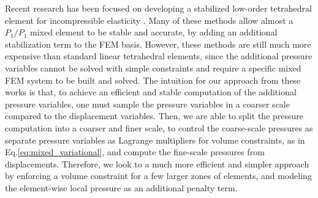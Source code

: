 Recent research has been focused on developing a stabilized low-order tetrahedral element for
incompressible elasticity \cite{scovazzi:2016}. Many of these methods allow almost a $P_1 / P_1$
mixed element to be stable and accurate, by adding an additional stabilization term to the FEM basis. However, these methods are still much more expensive than standard linear tetrahedral elements, since the additional pressure variables cannot be solved with simple constraints and require a specific mixed FEM system to be built and solved.
The intuition for our approach from these works is that, to achieve an efficient and stable computation of the additional pressure variables, one must sample the pressure variables in a coarser scale compared to the displacement variables. Then, we are able to split the pressure computation into a coarser and finer scale, to control the coarse-scale pressures as separate pressure variables as Lagrange multipliers for volume constraints, as in Eq.\ref{eq:mixed_variational}, and compute the fine-scale pressures from displacements. Therefore, we look to a much more efficient and simpler approach by enforcing a volume constraint for a few larger zones of elements, and modeling the element-wise local pressure as an additional penalty term.
